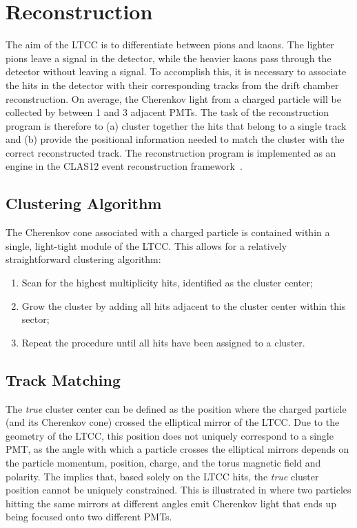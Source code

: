 \section{Reconstruction}

The aim of the LTCC is to differentiate between pions and kaons. The lighter pions leave a signal in the detector,
while the heavier kaons pass through the detector without leaving a signal. To accomplish this, it is necessary to
associate the hits in the detector with their corresponding tracks from the drift chamber reconstruction. On
average, the Cherenkov light from a charged particle will be collected by between 1 and 3 adjacent PMTs. The task
of the reconstruction program is therefore to (a) cluster together the hits that belong to a single track and (b)
provide the positional information needed to match the cluster with the correct reconstructed track. The
reconstruction program is implemented as an engine in the CLAS12 event reconstruction framework~\cite{recon-nim}.

\subsection{Clustering Algorithm}

The Cherenkov cone associated with a charged particle is contained within a single, light-tight module of the LTCC.
This allows for a relatively straightforward clustering algorithm:

\begin{enumerate}
    \item Scan for the highest multiplicity hits, identified as the cluster center;
    \item Grow the cluster by adding all hits adjacent to the cluster center within this sector;
    \item Repeat the procedure until all hits have been assigned to a cluster.
\end{enumerate}

\subsection{Track Matching}

The \textit{true} cluster center can be defined as the position where the charged particle (and its Cherenkov cone)
crossed the elliptical mirror of the LTCC. Due to the geometry of the LTCC, this position does not uniquely correspond
to a single PMT, as the angle with which a particle crosses the elliptical mirrors depends on the particle momentum,
position, charge, and the torus magnetic field and polarity. The implies that, based solely on the LTCC hits, the
\textit{true} cluster position cannot be uniquely constrained. This is illustrated in  where two
particles hitting the same mirrors at different angles emit Cherenkov light that ends up being focused onto
two different PMTs.

